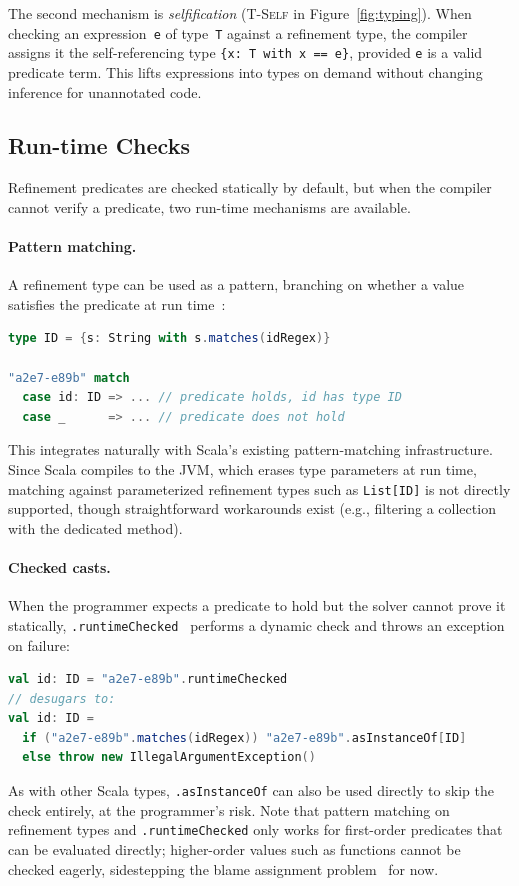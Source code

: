 \documentclass[acmsmall]{acmart}
\begin{document}
The second mechanism is \emph{selfification} (\textsc{T-Self} in Figure~\ref{fig:typing}). When checking an expression~\lstinline!e! of type~\lstinline!T! against a refinement type, the compiler assigns it the self-referencing type \lstinline!{x: T with x == e}!, provided \lstinline!e! is a valid predicate term. This lifts expressions into types on demand without changing inference for unannotated code.

\subsection{Run-time Checks}\label{sec:runtime}

Refinement predicates are checked statically by default, but when the compiler cannot verify a predicate, two run-time mechanisms are available.

\paragraph{Pattern matching.} A refinement type can be used as a pattern, branching on whether a value satisfies the predicate at run time~\cite{quentin}:
%
\begin{lstlisting}[language=Scala]
type ID = {s: String with s.matches(idRegex)}

"a2e7-e89b" match
  case id: ID => ... // predicate holds, id has type ID
  case _      => ... // predicate does not hold
\end{lstlisting}
%
This integrates naturally with Scala's existing pattern-matching infrastructure. Since Scala compiles to the JVM, which erases type parameters at run time, matching against parameterized refinement types such as \lstinline!List[ID]! is not directly supported, though straightforward workarounds exist (e.g., filtering a collection with the dedicated method).

\paragraph{Checked casts.} When the programmer expects a predicate to hold but the solver cannot prove it statically, \lstinline!.runtimeChecked!~\cite{valentin} performs a dynamic check and throws an exception on failure:
%
\begin{lstlisting}[language=Scala]
val id: ID = "a2e7-e89b".runtimeChecked
// desugars to:
val id: ID =
  if ("a2e7-e89b".matches(idRegex)) "a2e7-e89b".asInstanceOf[ID]
  else throw new IllegalArgumentException()
\end{lstlisting}
%
As with other Scala types, \lstinline!.asInstanceOf! can also be used directly to skip the check entirely, at the programmer's risk.
%
Note that pattern matching on refinement types and \lstinline!.runtimeChecked! only works for first-order predicates that can be evaluated directly; higher-order values such as functions cannot be checked eagerly, sidestepping the blame assignment problem~\cite{keil2015} for now.
\end{document}
